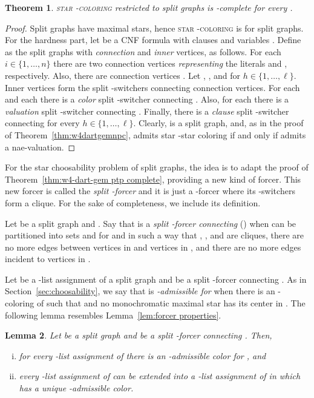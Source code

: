 \documentclass[a4paper, 11pt, oneside]{article}
\newtheorem{theorem}{Theorem}
\newtheorem{lemma}[theorem]{Lemma}
\newcommand{\stcol}[1]{\textsc{star -coloring}}
\newcommand{\range}[3]{\ensuremath{#1 \in \{#2,\ldots,#3\}}}
\let\Definition=\emph
\begin{document}
\begin{theorem}\label{thm:splitnpc}
\stcol{k} restricted to split graphs is -complete for every . 
\end{theorem}

\begin{proof}
 Split graphs have  maximal stars, hence \stcol{k} is  for split graphs.  For the hardness part, let  be a CNF formula with  clauses  and  variables .  Define  as the split graphs with \Definition{connection} and \Definition{inner} vertices, as follows.  For each \range{i}{1}{n} there are two connection vertices  \Definition{representing} the literals  and , respectively.  Also, there are  connection vertices .  Let , , and  for \range{h}{1}{\ell}.  Inner vertices form the split -switchers connecting connection vertices.  For each  and each  there is a \Definition{color} split -switcher connecting .  Also, for each  there is a \Definition{valuation} split -switcher connecting .  Finally, there is a \Definition{clause} split -switcher connecting  for every \range{h}{1}{\ell}. Clearly,  is a split graph, and, as in the proof of Theorem~\ref{thm:w4dartgemnpc},  admits star -star coloring if and only if  admits a nae-valuation.
\end{proof}


For the star choosability problem of split graphs, the idea is to adapt the proof of Theorem~\ref{thm:w4-dart-gem ptp complete}, providing a new kind of forcer.  This new forcer is called the \emph{split -forcer} and it is just a -forcer where its -switchers form a clique.  For the sake of completeness, we include its definition.

\begin{defn}\label{def:k-split-forcer connection}
  Let  be a split graph and .  Say that  is a \emph{split -forcer connecting } () when  can be partitioned into sets  and  for  and  in such a way that , ,  and  are cliques, there are no more edges between vertices in  and vertices in , and there are no more edges incident to vertices in .
\end{defn}

Let  be a -list assignment of a split graph  and  be a split -forcer connecting .  As in Section~\ref{sec:choosability}, we say that  is \emph{-admissible for } when there is an -coloring  of  such that  and no monochromatic maximal star has its center in .  The following lemma resembles Lemma~\ref{lem:forcer properties}.

\begin{lemma}\label{lem:split forcer properties}
  Let  be a split graph and  be a split -forcer connecting .  Then, 
  \begin{enumerate}[(i)]
    \item for every -list assignment  of  there is an -admissible color for , and\label{lem:split forcer properties:extension}
    \item every -list assignment  of  can be extended into a -list assignment of  in which  has a unique -admissible color.
  \end{enumerate}
\end{lemma}
\end{document}
